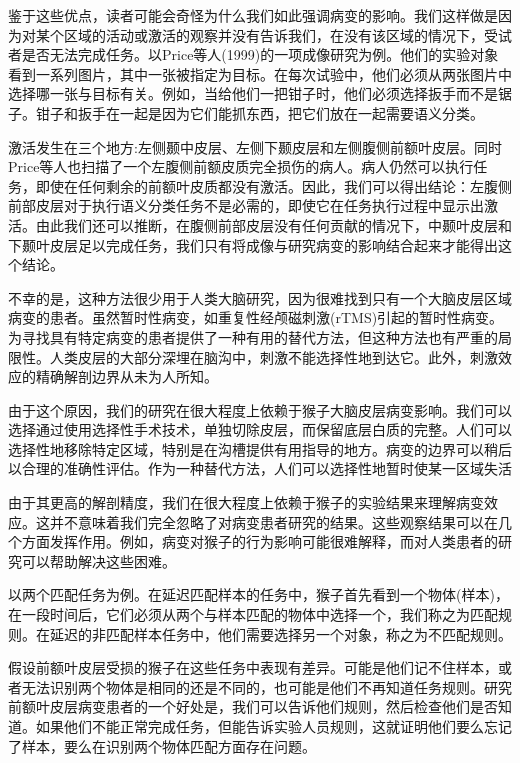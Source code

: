 \par
鉴于这些优点，读者可能会奇怪为什么我们如此强调病变的影响。我们这样做是因为对某个区域的活动或激活的观察并没有告诉我们，在没有该区域的情况下，受试者是否无法完成任务。以Price等人(1999)的一项成像研究为例。他们的实验对象看到一系列图片，其中一张被指定为目标。在每次试验中，他们必须从两张图片中选择哪一张与目标有关。例如，当给他们一把钳子时，他们必须选择扳手而不是锯子。钳子和扳手在一起是因为它们能抓东西，把它们放在一起需要语义分类。

\par
激活发生在三个地方:左侧颞中皮层、左侧下颞皮层和左侧腹侧前额叶皮层。同时Price等人也扫描了一个左腹侧前额皮质完全损伤的病人。病人仍然可以执行任务，即使在任何剩余的前额叶皮质都没有激活。因此，我们可以得出结论：左腹侧前部皮层对于执行语义分类任务不是必需的，即使它在任务执行过程中显示出激活。由此我们还可以推断，在腹侧前部皮层没有任何贡献的情况下，中颞叶皮层和下颞叶皮层足以完成任务，我们只有将成像与研究病变的影响结合起来才能得出这个结论。

\par
不幸的是，这种方法很少用于人类大脑研究，因为很难找到只有一个大脑皮层区域病变的患者。虽然暂时性病变，如重复性经颅磁刺激(rTMS)引起的暂时性病变。为寻找具有特定病变的患者提供了一种有用的替代方法，但这种方法也有严重的局限性。人类皮层的大部分深埋在脑沟中，刺激不能选择性地到达它。此外，刺激效应的精确解剖边界从未为人所知。

\par
由于这个原因，我们的研究在很大程度上依赖于猴子大脑皮层病变影响。我们可以选择通过使用选择性手术技术，单独切除皮层，而保留底层白质的完整。人们可以选择性地移除特定区域，特别是在沟槽提供有用指导的地方。病变的边界可以稍后以合理的准确性评估。作为一种替代方法，人们可以选择性地暂时使某一区域失活

\par

由于其更高的解剖精度，我们在很大程度上依赖于猴子的实验结果来理解病变效应。这并不意味着我们完全忽略了对病变患者研究的结果。这些观察结果可以在几个方面发挥作用。例如，病变对猴子的行为影响可能很难解释，而对人类患者的研究可以帮助解决这些困难。

\par
以两个匹配任务为例。在延迟匹配样本的任务中，猴子首先看到一个物体(样本)，在一段时间后，它们必须从两个与样本匹配的物体中选择一个，我们称之为匹配规则。在延迟的非匹配样本任务中，他们需要选择另一个对象，称之为不匹配规则。

\par
假设前额叶皮层受损的猴子在这些任务中表现有差异。可能是他们记不住样本，或者无法识别两个物体是相同的还是不同的，也可能是他们不再知道任务规则。研究前额叶皮层病变患者的一个好处是，我们可以告诉他们规则，然后检查他们是否知道。如果他们不能正常完成任务，但能告诉实验人员规则，这就证明他们要么忘记了样本，要么在识别两个物体匹配方面存在问题。

